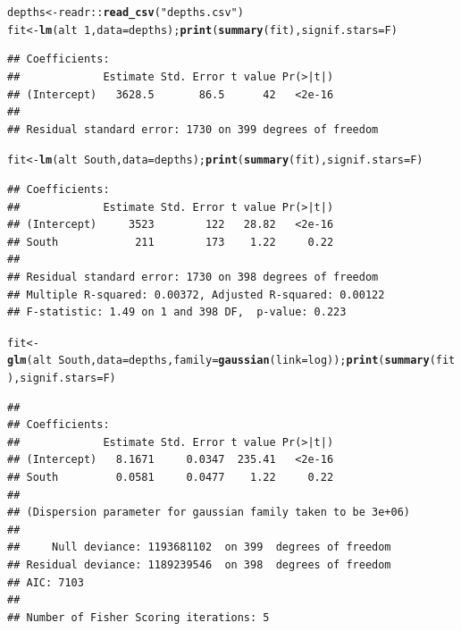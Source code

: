 \documentclass[10pt]{beamer}\usepackage[]{graphicx}\usepackage[]{color}
\makeatletter
\newcommand{\hlnum}[1]{\textcolor[rgb]{0.686,0.059,0.569}{#1}}%
\newcommand{\hlstr}[1]{\textcolor[rgb]{0.192,0.494,0.8}{#1}}%
\newcommand{\hlopt}[1]{\textcolor[rgb]{0,0,0}{#1}}%
\newcommand{\hlstd}[1]{\textcolor[rgb]{0.345,0.345,0.345}{#1}}%
\newcommand{\hlkwb}[1]{\textcolor[rgb]{0.69,0.353,0.396}{#1}}%
\newcommand{\hlkwc}[1]{\textcolor[rgb]{0.333,0.667,0.333}{#1}}%
\newcommand{\hlkwd}[1]{\textcolor[rgb]{0.737,0.353,0.396}{\textbf{#1}}}%
\newenvironment{kframe}{%
 \def\at@end@of@kframe{}%
 \ifinner\ifhmode%
  \def\at@end@of@kframe{\end{minipage}}%
  \begin{minipage}{\columnwidth}%
 \fi\fi%
 \def\FrameCommand##1{\hskip\@totalleftmargin \hskip-\fboxsep
 \colorbox{shadecolor}{##1}\hskip-\fboxsep
     \hskip-\linewidth \hskip-\@totalleftmargin \hskip\columnwidth}%
 \MakeFramed {\advance\hsize-\width
   \@totalleftmargin\z@ \linewidth\hsize
   \@setminipage}}%
 {\par\unskip\endMakeFramed%
 \at@end@of@kframe}
\newenvironment{knitrout}{}{} %
\makeatother
\begin{document}
\begin{frame}
	\vspace*{-1.0in}

	
\begin{knitrout}\tiny
{}\color{fgcolor}\begin{kframe}
\begin{alltt}
\hlstd{depths} \hlkwb{<-} \hlstd{readr}\hlopt{::}\hlkwd{read_csv}\hlstd{(}\hlstr{"depths.csv"}\hlstd{)}
\hlstd{fit} \hlkwb{<-} \hlkwd{lm}\hlstd{(alt} \hlopt{~} \hlnum{1}\hlstd{,} \hlkwc{data} \hlstd{= depths);} \hlkwd{print}\hlstd{(}\hlkwd{summary}\hlstd{(fit),} \hlkwc{signif.stars} \hlstd{= F)}
\end{alltt}
\begin{verbatim}
## Coefficients:
##             Estimate Std. Error t value Pr(>|t|)
## (Intercept)   3628.5       86.5      42   <2e-16
## 
## Residual standard error: 1730 on 399 degrees of freedom
\end{verbatim}
\begin{alltt}
\hlstd{fit} \hlkwb{<-} \hlkwd{lm}\hlstd{(alt} \hlopt{~} \hlstd{South,} \hlkwc{data} \hlstd{= depths);} \hlkwd{print}\hlstd{(}\hlkwd{summary}\hlstd{(fit),} \hlkwc{signif.stars} \hlstd{= F)}
\end{alltt}
\begin{verbatim}
## Coefficients:
##             Estimate Std. Error t value Pr(>|t|)
## (Intercept)     3523        122   28.82   <2e-16
## South            211        173    1.22     0.22
## 
## Residual standard error: 1730 on 398 degrees of freedom
## Multiple R-squared: 0.00372,	Adjusted R-squared: 0.00122 
## F-statistic: 1.49 on 1 and 398 DF,  p-value: 0.223
\end{verbatim}
\begin{alltt}
\hlstd{fit} \hlkwb{<-} \hlkwd{glm}\hlstd{(alt} \hlopt{~} \hlstd{South,} \hlkwc{data} \hlstd{= depths,} \hlkwc{family} \hlstd{=} \hlkwd{gaussian}\hlstd{(}\hlkwc{link}\hlstd{=log));} \hlkwd{print}\hlstd{(}\hlkwd{summary}\hlstd{(fit),} \hlkwc{signif.stars} \hlstd{= F)}
\end{alltt}
\begin{verbatim}
## 
## Coefficients:
##             Estimate Std. Error t value Pr(>|t|)
## (Intercept)   8.1671     0.0347  235.41   <2e-16
## South         0.0581     0.0477    1.22     0.22
## 
## (Dispersion parameter for gaussian family taken to be 3e+06)
## 
##     Null deviance: 1193681102  on 399  degrees of freedom
## Residual deviance: 1189239546  on 398  degrees of freedom
## AIC: 7103
## 
## Number of Fisher Scoring iterations: 5
\end{verbatim}
\end{kframe}
\end{knitrout}
	
\end{frame}
\end{document}
